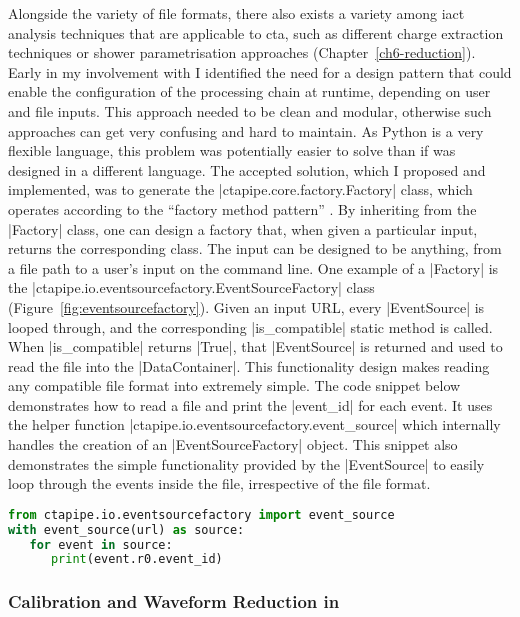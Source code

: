 Alongside the variety of file formats, there also exists a variety among \gls{iact} analysis techniques that are applicable to \gls{cta}, such as different charge extraction techniques or shower parametrisation approaches (Chapter~\ref{ch6-reduction}). Early in my involvement with  I identified the need for a design pattern that could enable the configuration of the processing chain at runtime, depending on user and file inputs. This approach needed to be clean and modular, otherwise such approaches can get very confusing and hard to maintain. As Python is a very flexible language, this problem was potentially easier to solve than if  was designed in a different language. The accepted solution, which I proposed and implemented, was to generate the |ctapipe.core.factory.Factory| class, which operates according to the ``factory method pattern'' \cite{johnson2005design}. By inheriting from the |Factory| class, one can design a factory that, when given a particular input, returns the corresponding class. The input can be designed to be anything, from a file path to a user's input on the command line. One example of a |Factory| is the |ctapipe.io.eventsourcefactory.EventSourceFactory| class (Figure~\ref{fig:eventsourcefactory}). Given an input URL, every |EventSource| is looped through, and the corresponding |is_compatible| static method is called. When |is_compatible| returns |True|, that |EventSource| is returned and used to read the file into the |DataContainer|. This functionality design makes reading any compatible file format into  extremely simple. The code snippet below demonstrates how to read a file and print the |event_id| for each event. It uses the helper function |ctapipe.io.eventsourcefactory.event_source| which internally handles the creation of an |EventSourceFactory| object. This snippet also demonstrates the simple functionality provided by the |EventSource| to easily loop through the events inside the file, irrespective of the file format.

\begin{lstlisting}[language=Python]
from ctapipe.io.eventsourcefactory import event_source
with event_source(url) as source:
   for event in source:
      print(event.r0.event_id)
\end{lstlisting}

\subsubsection{Calibration and Waveform Reduction in }


